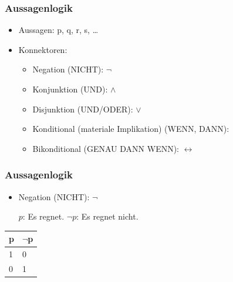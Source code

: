 
\begin{frame}
\frametitle{Aussagenlogik}

\begin{itemize}
	\item Aussagen: p, q, r, s, \dots
	\medskip
	\item Konnektoren:
	
	\begin{itemize}
		\item Negation (NICHT): $\lnot$
		\medskip
		\item Konjunktion (UND): $\land$
		\medskip
		\item Disjunktion (UND/ODER): $\lor$
		\medskip
		\item Konditional (materiale Implikation) (WENN, DANN): \ras
		\medskip
		\item Bikonditional (GENAU DANN WENN): $\leftrightarrow$
	\end{itemize}
	
\end{itemize}

\end{frame}



\begin{frame}
\frametitle{Aussagenlogik}

\begin{itemize}
	\item Negation (NICHT): $\lnot$
	
	\eal
		\ex $p$: Es regnet.
		\ex $\lnot p$: Es regnet nicht.
	\zl
	
\end{itemize}

\begin{table}
\centering
\begin{tabular}{p{3cm}|p{3cm}}
\textbf{p} & \textbf{$\lnot$p}\\
\hline
1 & 0\\
\hline
0 & 1\\
\end{tabular}
\end{table}

\end{frame}



